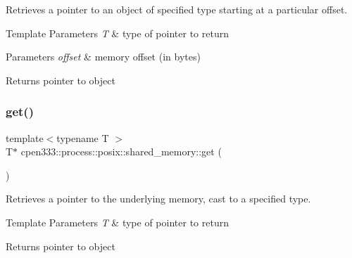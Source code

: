Retrieves a pointer to an object of specified type starting at a particular offset. 


\begin{DoxyTemplParams}{Template Parameters}
{\em T} & type of pointer to return \\
\hline
\end{DoxyTemplParams}

\begin{DoxyParams}{Parameters}
{\em offset} & memory offset (in bytes) \\
\hline
\end{DoxyParams}
\begin{DoxyReturn}{Returns}
pointer to object 
\end{DoxyReturn}
\mbox{\label{classcpen333_1_1process_1_1posix_1_1shared__memory_a705beedc2e0b3bde2e044fe742f641ea}} 
\subsubsection{\texorpdfstring{get()}{get()}\hspace{0.1cm}{\footnotesize\ttfamily [3/3]}}
{\footnotesize\ttfamily template$<$typename T $>$ \\
T$\ast$ cpen333\+::process\+::posix\+::shared\+\_\+memory\+::get (\begin{DoxyParamCaption}{ }\end{DoxyParamCaption})\hspace{0.3cm}{\ttfamily [inline]}}



Retrieves a pointer to the underlying memory, cast to a specified type. 


\begin{DoxyTemplParams}{Template Parameters}
{\em T} & type of pointer to return \\
\hline
\end{DoxyTemplParams}
\begin{DoxyReturn}{Returns}
pointer to object 
\end{DoxyReturn}
\mbox{\label{classcpen333_1_1process_1_1posix_1_1shared__memory_ac0dd258666565953b8c6bdbde7aa871f}} 
